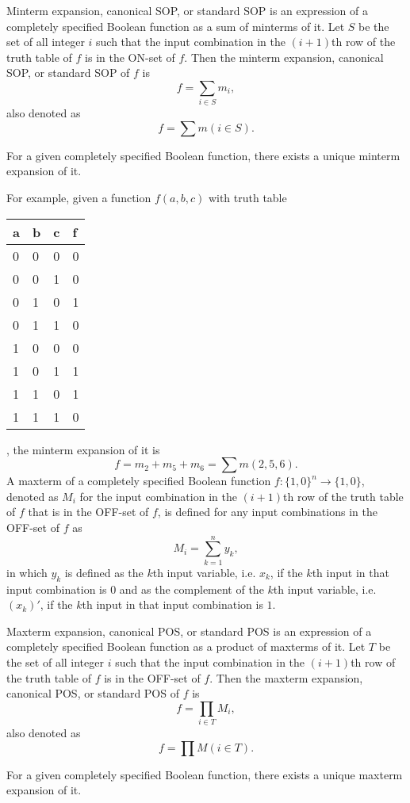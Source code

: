 \documentclass[a4paper,12pt]{report}
\begin{document}
\begin{itemize}
\begin{itemize}
\begin{itemize}
\begin{itemize}
\begin{itemize}
\begin{itemize}
\begin{itemize}
\begin{itemize}
Minterm expansion, canonical SOP, or standard SOP is an expression of a completely specified Boolean function as a sum of minterms of it. Let $S$ be the set of all integer $i$ such that the input combination in the $(i+1)$th row of the truth table of $f$ is in the ON-set of $f$. Then the minterm expansion, canonical SOP, or standard SOP of $f$ is
\[f=\sum_{i\in S}m_i,\]
also denoted as
\[f=\sum m(i\in S).\]

For a given completely specified Boolean function, there exists a unique minterm expansion of it.

For example, given a function $f(a,b,c)$ with truth table
\begin{longtable}[c]{|m|m|m|m|}
\hline
a & b & c & f\\\hline
0 & 0 & 0 & 0\\\hline
0 & 0 & 1 & 0\\\hline
0 & 1 & 0 & 1\\\hline
0 & 1 & 1 & 0\\\hline
1 & 0 & 0 & 0\\\hline
1 & 0 & 1 & 1\\\hline
1 & 1 & 0 & 1\\\hline
1 & 1 & 1 & 0\\\hline
\end{longtable}
, the minterm expansion of it is
\[f=m_2+m_5+m_6=\sum m(2,5,6).\]
A maxterm of a completely specified Boolean function $f\colon\{1,0\}^n\to\{1,0\}$, denoted as $M_i$ for the input combination in the $(i+1)$th row of the truth table of $f$ that is in the OFF-set of $f$, is defined for any input combinations in the OFF-set of $f$ as
\[M_i=\sum_{k=1}^ny_k,\]
in which $y_k$ is defined as the $k$th input variable, i.e. $x_k$, if the $k$th input in that input combination is $0$ and as the complement of the $k$th input variable, i.e. $(x_k)'$, if the $k$th input in that input combination is $1$.

Maxterm expansion, canonical POS, or standard POS is an expression of a completely specified Boolean function as a product of maxterms of it. Let $T$ be the set of all integer $i$ such that the input combination in the $(i+1)$th row of the truth table of $f$ is in the OFF-set of $f$. Then the maxterm expansion, canonical POS, or standard POS of $f$ is
\[f=\prod_{i\in T}M_i,\]
also denoted as 
\[f=\prod M(i\in T).\]

For a given completely specified Boolean function, there exists a unique maxterm expansion of it.


\end{itemize}
\end{itemize}
\end{itemize}
\end{itemize}
\end{itemize}
\end{itemize}
\end{itemize}
\end{itemize}
\end{document}
